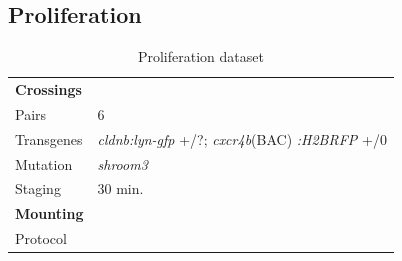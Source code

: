 \documentclass[11pt,singlespacinge,twoside]{reedthesis} %
\begin{document}
\hypertarget{tl-data}{%
\subsection{Proliferation}\label{tl-data}}
\begin{longtable}[]{@{}ll@{}}
\caption{\label{tab:prolifdata} Proliferation dataset}\tabularnewline
\toprule
\endhead
\begin{minipage}[t]{0.21\columnwidth}\raggedright
\textbf{Crossings}\strut
\end{minipage} & \begin{minipage}[t]{0.73\columnwidth}\raggedright
\strut
\end{minipage}\tabularnewline
\begin{minipage}[t]{0.21\columnwidth}\raggedright
Pairs\strut
\end{minipage} & \begin{minipage}[t]{0.73\columnwidth}\raggedright
6\strut
\end{minipage}\tabularnewline
\begin{minipage}[t]{0.21\columnwidth}\raggedright
Transgenes\strut
\end{minipage} & \begin{minipage}[t]{0.73\columnwidth}\raggedright
\emph{cldnb:lyn-gfp} +/?; \emph{cxcr4b}(BAC) \emph{:H2BRFP} +/0\strut
\end{minipage}\tabularnewline
\begin{minipage}[t]{0.21\columnwidth}\raggedright
Mutation\strut
\end{minipage} & \begin{minipage}[t]{0.73\columnwidth}\raggedright
\emph{shroom3}\strut
\end{minipage}\tabularnewline
\begin{minipage}[t]{0.21\columnwidth}\raggedright
Staging\strut
\end{minipage} & \begin{minipage}[t]{0.73\columnwidth}\raggedright
30 min.\strut
\end{minipage}\tabularnewline
\begin{minipage}[t]{0.21\columnwidth}\raggedright
\textbf{Mounting}\strut
\end{minipage} & \begin{minipage}[t]{0.73\columnwidth}\raggedright
\strut
\end{minipage}\tabularnewline
\begin{minipage}[t]{0.21\columnwidth}\raggedright
Protocol\strut
\end{minipage} & \begin{minipage}[t]{0.73\columnwidth}\raggedright

\end{minipage}
\end{longtable}
\end{document}
